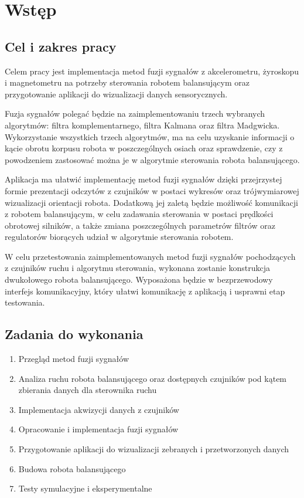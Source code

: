 \chapter{Wstęp}

\section{Cel i zakres pracy}

Celem pracy jest implementacja metod fuzji sygnałów z akcelerometru, żyroskopu i magnetometru na potrzeby sterowania robotem balansującym oraz przygotowanie aplikacji do wizualizacji danych sensorycznych.

Fuzja sygnałów polegać będzie na zaimplementowaniu trzech wybranych algorytmów: filtra komplementarnego, filtra Kalmana oraz filtra Madgwicka. Wykorzystanie wszystkich trzech algorytmów, ma na celu uzyskanie informacji o kącie obrotu korpusu robota w poszczególnych osiach oraz sprawdzenie, czy z powodzeniem zastosować można je w algorytmie sterowania robota balansującego.

Aplikacja ma ułatwić implementację metod fuzji sygnałów dzięki przejrzystej formie prezentacji odczytów z czujników w postaci wykresów oraz trójwymiarowej wizualizacji orientacji robota. Dodatkową jej zaletą będzie możliwość komunikacji z robotem balansującym, w celu zadawania sterowania w postaci prędkości obrotowej silników, a także zmiana poszczególnych parametrów filtrów oraz regulatorów biorących udział w algorytmie sterowania robotem.

W celu przetestowania zaimplementowanych metod fuzji sygnałów pochodzących z czujników ruchu i algorytmu sterowania, wykonana zostanie konstrukcja dwukołowego robota balansującego. Wyposażona będzie w bezprzewodowy interfejs komunikacyjny, który ułatwi komunikację z aplikacją i usprawni etap testowania.

\section{Zadania do wykonania}

\begin{enumerate}
    \item Przegląd metod fuzji sygnałów
    \item Analiza ruchu robota balansującego oraz dostępnych czujników pod kątem zbierania danych dla sterownika ruchu 
    \item Implementacja akwizycji danych z czujników
    \item Opracowanie i implementacja fuzji sygnałów
    \item Przygotowanie aplikacji do wizualizacji zebranych i przetworzonych danych
    \item Budowa robota balansującego
    \item Testy symulacyjne i eksperymentalne
\end{enumerate}

